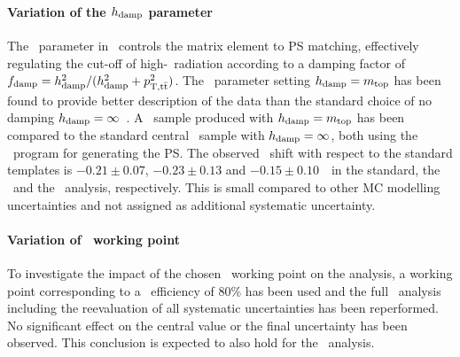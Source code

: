 \paragraph{Variation of the \boldmath$h_{\mathrm{damp}}$ parameter}\mbox{}
%
The \hdamp\ parameter in \Powheg\ controls the matrix element to \gls{PS} matching, effectively regulating the cut-off of high-\pt\ radiation according to a damping factor of $f_\mathrm{damp}=h_{\mathrm{damp}}^2/(h_{\mathrm{damp}}^2+p_\mathrm{T,t\bar{t}}^2)$.
%
The \Powheg\ parameter setting $h_{\mathrm{damp}}=m_{\mathrm{top}}$ has been found to provide better description of the data than the standard choice of no damping $h_{\mathrm{damp}}=\infty$~\cite{ATLASCollaboration2015}.
%
A \Powheg\ sample produced with $h_{\mathrm{damp}}=m_{\mathrm{top}}$ has been compared to the standard central \ttbar\ sample with $h_{\mathrm{damp}}=\infty$, both using the \Pythiasix\ program for generating the \gls{PS}. The observed \mt\ shift with respect to the standard templates is $-0.21\pm0.07$, $-0.23\pm0.13$ and $-0.15\pm0.10$~\GeV\ in the standard, the \cutbased\ and the \mvabased\ analysis, respectively. This is small compared to other \gls{MC} modelling uncertainties and not assigned as additional systematic uncertainty.
%
\paragraph{Variation of \btag\ working point}\mbox{}
%
To investigate the impact of the chosen \btag\ working point on the analysis, a working point corresponding to a \btag\ efficiency of 80\% has been used and the full \cutbased\ analysis including the reevaluation of all systematic uncertainties has been reperformed. No significant effect on the central value or the final uncertainty has been observed. This conclusion is expected to also hold for the \mvabased\ analysis.
%





